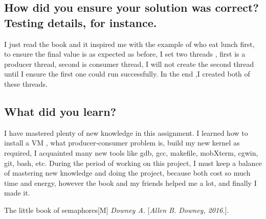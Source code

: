 \documentclass[10pt,draftclsnofoot,peerreview,letterpaper,onecolumn,]{IEEEtran}
\begin{document}
\subsection{How did you ensure your solution was correct? Testing details, for instance.}
I just read the book and it inspired me with the example of who eat lunch first, to ensure the final value is as expected as before, I set two threads , first is a producer thread, second is consumer thread, I will not create the second thread until I ensure the first one could run successfully. In the end ,I created both of these threads.

\subsection{What did you learn?}
I have mastered plenty of new knowledge in this assignment. I learned how to install a VM , what producer-consumer problem is, build my new kernel as required, I acquainted many new tools like gdb, gcc, makefile, mobXterm, cgwin, git, bash, etc. During the period of working on this project, I must keep a balance of mastering new knowledge and doing the project, because both cost so much time and energy, however the book and my friends helped me a lot, and finally I made it.

\begin{thebibliography}{1}

 The little book of semaphores[M]
\textit{Downey A.}
[\textit{Allen B. Downey, 2016.}].

\end{thebibliography}
\end{document}
